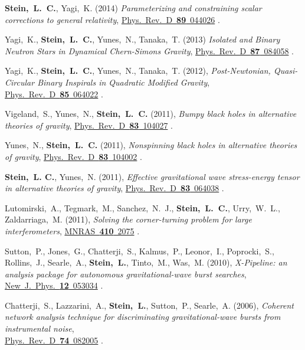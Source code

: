 \begin{etaremune}[start=\value{pubCounter}]
  {\bf Stein,~L.~C.}, Yagi,~K.
  (2014)
  {\it Parameterizing and constraining scalar corrections to general relativity},
  \href{http://dx.doi.org/10.1103/PhysRevD.89.044026}{Phys.~Rev.~D~{\bf 89}~044026}
  .
\item
  Yagi,~K., {\bf Stein,~L.~C.}, Yunes,~N., Tanaka,~T.
  (2013)
  {\it Isolated and Binary Neutron Stars in Dynamical Chern-Simons Gravity},
  \href{http://dx.doi.org/10.1103/PhysRevD.87.084058}{Phys.~Rev.~D~{\bf 87}~084058}
  .
\item
  Yagi,~K., {\bf Stein,~L.~C.}, Yunes,~N., Tanaka,~T.
  (2012),
  {\it Post-Newtonian, Quasi-Circular Binary Inspirals in Quadratic Modified Gravity},
  \href{http://dx.doi.org/10.1103/PhysRevD.85.064022}{Phys.~Rev.~D~{\bf 85}~064022}
  .
\item
  Vigeland,~S., Yunes,~N., {\bf Stein,~L.~C.}
  (2011),
  {\it Bumpy black holes in alternative theories of gravity},
  \href{http://dx.doi.org/10.1103/PhysRevD.83.104027}{Phys.~Rev.~D~{\bf 83}~104027}
  .
\item
  Yunes,~N., {\bf Stein,~L.~C.}
  (2011),
  {\it Nonspinning black holes in alternative theories of gravity},
  \href{http://dx.doi.org/10.1103/PhysRevD.83.104002}{Phys.~Rev.~D~{\bf 83}~104002}
  .
\item
  {\bf Stein,~L. C.}, Yunes,~N.
  (2011),
  {\it Effective gravitational wave stress-energy tensor in
    alternative theories of gravity},
  \href{http://dx.doi.org/10.1103/PhysRevD.83.064038}{Phys.~Rev.~D~{\bf 83}~064038}
  .
\item
  Lutomirski,~A., Tegmark,~M., Sanchez,~N.~J., {\bf
    Stein,~L.~C.}, Urry,~W.~L., Zaldarriaga,~M.
  (2011),
  {\it Solving the corner-turning problem for large interferometers},
  \href{http://dx.doi.org/10.1111/j.1365-2966.2010.17587.x}{MNRAS~{\bf 410}~2075}
  .
\item
  Sutton,~P., Jones,~G., Chatterji,~S., Kalmus,~P., Leonor,~I.,
  Poprocki,~S., Rollins,~J., Searle,~A., {\bf Stein,~L.}, Tinto,~M.,
  Was,~M.
  (2010),
  {\it X-Pipeline: an analysis package for autonomous
    gravitational-wave burst searches},
  \href{http://dx.doi.org/10.1088/1367-2630/12/5/053034}{New~J.~Phys.~{\bf 12}~053034}
  .
\item
  Chatterji,~S., Lazzarini,~A., {\bf Stein,~L.}, Sutton,~P.,
  Searle,~A.
  (2006),
  {\it Coherent network analysis technique for
    discriminating gravitational-wave bursts from instrumental noise},\\
  \href{http://dx.doi.org/10.1103/PhysRevD.74.082005}{Phys.~Rev.~D~{\bf 74}~082005}
  .
  \setcounter{pubCounter}{\value{enumi}}
\end{etaremune}


